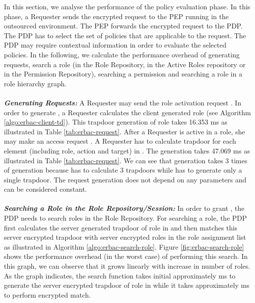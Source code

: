 \documentclass[epsfig,a4paper,11pt,titlepage]{book}
\numberwithin{algorithm}{chapter}
\begin{document}
In this section, we analyse the performance of the policy evaluation phase. In this phase, a Requester sends the encrypted request to the \gls{PEP} running in the outsourced environment. The \gls{PEP} forwards the encrypted request to the \gls{PDP}. The \gls{PDP} has to select the set of policies that are applicable to the request. The \gls{PDP} may require contextual information in order to evaluate the selected policies. In the following, we calculate the performance overhead of generating requests, search a role (in the Role Repository, in the Active Roles repository or in the Permission Repository), searching a permission and searching a role in a role hierarchy graph. \\ \\
\noindent \emph{\textbf{Generating Requests:}}
A Requester may send the role activation request . In order to generate , a Requester calculates the client generated role (see Algorithm \ref{algo:erbac-client-td}). This trapdoor generation of role takes 16.353 \gls{ms} as illustrated in Table \ref{tab:erbac-request}. After a Requester is active in a role, she may make an access request  . A Requester has to calculate trapdoor for each element (including role, action and target) in . The  generation takes 47.069 \gls{ms} as illustrated in Table \ref{tab:erbac-request}. We can see that  generation takes 3 times of  generation because  has to calculate 3 trapdoors while  has to generate only a single trapdoor. The request generation does not depend on any parameters and can be considered constant. \\ \\
\noindent \emph{\textbf{Searching a Role in the Role Repository/Session:}}
In order to grant , the \gls{PDP} needs to search roles in the Role Repository. For searching a role, the \gls{PDP} first calculates the server generated trapdoor of role in  and then matches this server encrypted trapdoor with server encrypted roles in the role assignment list as illustrated in Algorithm \ref{algo:erbac-search-role}. Figure \ref{fig:erbac-search-role} shows the performance overhead (in the worst case) of performing this search. In this graph, we can observe that it grows linearly with increase in number of roles. As the graph indicates, the search function takes initial approximately  \gls{ms} to generate the server encrypted trapdoor of role in  while it takes approximately  \gls{ms} to perform encrypted match.
\end{document}
